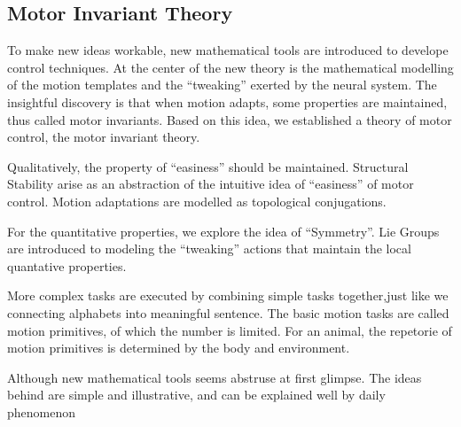 \subsection{Motor Invariant Theory}
%
%
%
To make new ideas workable, new mathematical tools are introduced to develope control techniques.
At the center of the new theory is the mathematical modelling of the motion templates and the ``tweaking'' exerted by the neural system.
The insightful discovery is that when motion adapts, some properties are maintained, thus called motor invariants.
Based on this idea, we established a theory of motor control, the motor invariant theory.


Qualitatively, the property of ``easiness'' should be maintained.
Structural Stability arise as an abstraction of the intuitive idea of ``easiness'' of motor control.
Motion adaptations are modelled as topological conjugations. 

For the quantitative properties, we explore the idea of ``Symmetry''.
Lie Groups are introduced to modeling the ``tweaking'' actions that maintain the local quantative properties.


More complex tasks are executed by combining simple tasks together,just like we connecting alphabets into meaningful sentence.
The basic motion tasks are called motion primitives, of which the number is limited.
For an animal, the repetorie of motion primitives is determined by the body and environment.


Although new mathematical tools seems abstruse at first glimpse.
The ideas behind are simple and illustrative, and can be explained well by daily phenomenon



